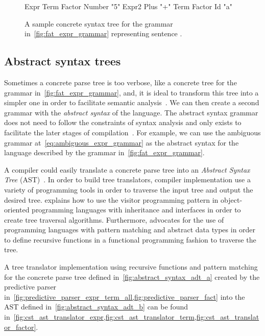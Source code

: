 \documentclass[
  oneside,
  english,
  coorientadorbanca,
  noabntexcite
]{ufsc-thesis-rn46-2019}
\newcommand{\code}[1]{\text{\scpfamily\setlength\spaceskip{0.35em}#1}}
\begin{document}
\begin{figure}[ht]
  \centering
  \begin{minipage}{0.5\textwidth}
    \begin{rustcode}
Expr
  Term
    Factor
      Number "5"
  Expr2
    Plus "+"
    Term
      Factor
        Id "a"
    \end{rustcode}
  \end{minipage}
  \caption{
    A sample concrete syntax tree for the grammar in~\cref{fig:fat_expr_grammar} representing sentence \code{5 + a}.
  }\label{fig:concrete_syntax_tree}
\end{figure}

\subsection{Abstract syntax trees}\label{sec:syntax:subsec:abstrac_syntax_trees}

Sometimes a concrete parse tree is too verbose, like a concrete tree for the grammar in~\cref{fig:fat_expr_grammar}, and, it is ideal to transform this tree into a simpler one in order to facilitate semantic analysis~\cite{appel2003modern}.
We can then create a second grammar with the \textit{abstract syntax} of the language.
The abstract syntax grammar does not need to follow the constraints of syntax analysis and only exists to facilitate the later stages of compilation~\cite{appel2003modern}.
For example, we can use the ambiguous grammar at~\eqref{eq:ambiguous_expr_grammar} as the abstract syntax for the language described by the grammar in~\cref{fig:fat_expr_grammar}.

A compiler could easily translate a concrete parse tree into an \textit{Abstract Syntax Tree} (AST)~\cite{appel2003modern}.
In order to build tree translators, compiler implementation use a variety of programming tools in order to traverse the input tree and output the desired tree.
\textcite{appel2003modern} explains how to use the visitor programming pattern in object-oriented programming languages with inheritance and interfaces in order to create tree traversal algorithms.
Furthermore, \textcite{pierce2002types} advocates for the use of programming languages with pattern matching and abstract data types in order to define recursive functions in a functional programming fashion to traverse the tree.

A tree translator implementation using recursive functions and pattern matching for the concrete parse tree \code{Parse} defined in~\cref{fig:abstract_syntax_adt_a} created by the predictive parser in~\cref{fig:predictive_parser_expr_term_all,fig:predictive_parser_fact} into the AST defined in~\cref{fig:abstract_syntax_adt_b} can be found in~\cref{fig:cst_ast_translator_expr,fig:cst_ast_translator_term,fig:cst_ast_translator_factor}.
\end{document}
